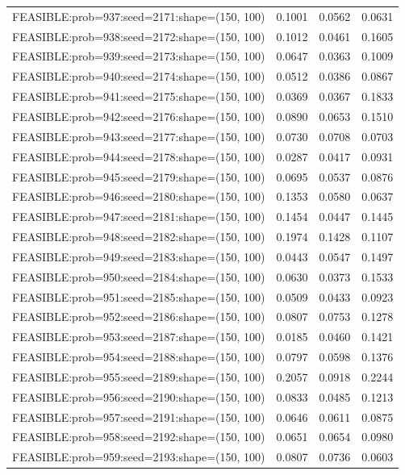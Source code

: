 \begin{longtable}{lccc}
FEASIBLE:prob=937:seed=2171:shape=(150, 100) & 0.1001 & 0.0562 & 0.0631 \\
FEASIBLE:prob=938:seed=2172:shape=(150, 100) & 0.1012 & 0.0461 & 0.1605 \\
FEASIBLE:prob=939:seed=2173:shape=(150, 100) & 0.0647 & 0.0363 & 0.1009 \\
FEASIBLE:prob=940:seed=2174:shape=(150, 100) & 0.0512 & 0.0386 & 0.0867 \\
FEASIBLE:prob=941:seed=2175:shape=(150, 100) & 0.0369 & 0.0367 & 0.1833 \\
FEASIBLE:prob=942:seed=2176:shape=(150, 100) & 0.0890 & 0.0653 & 0.1510 \\
FEASIBLE:prob=943:seed=2177:shape=(150, 100) & 0.0730 & 0.0708 & 0.0703 \\
FEASIBLE:prob=944:seed=2178:shape=(150, 100) & 0.0287 & 0.0417 & 0.0931 \\
FEASIBLE:prob=945:seed=2179:shape=(150, 100) & 0.0695 & 0.0537 & 0.0876 \\
FEASIBLE:prob=946:seed=2180:shape=(150, 100) & 0.1353 & 0.0580 & 0.0637 \\
FEASIBLE:prob=947:seed=2181:shape=(150, 100) & 0.1454 & 0.0447 & 0.1445 \\
FEASIBLE:prob=948:seed=2182:shape=(150, 100) & 0.1974 & 0.1428 & 0.1107 \\
FEASIBLE:prob=949:seed=2183:shape=(150, 100) & 0.0443 & 0.0547 & 0.1497 \\
FEASIBLE:prob=950:seed=2184:shape=(150, 100) & 0.0630 & 0.0373 & 0.1533 \\
FEASIBLE:prob=951:seed=2185:shape=(150, 100) & 0.0509 & 0.0433 & 0.0923 \\
FEASIBLE:prob=952:seed=2186:shape=(150, 100) & 0.0807 & 0.0753 & 0.1278 \\
FEASIBLE:prob=953:seed=2187:shape=(150, 100) & 0.0185 & 0.0460 & 0.1421 \\
FEASIBLE:prob=954:seed=2188:shape=(150, 100) & 0.0797 & 0.0598 & 0.1376 \\
FEASIBLE:prob=955:seed=2189:shape=(150, 100) & 0.2057 & 0.0918 & 0.2244 \\
FEASIBLE:prob=956:seed=2190:shape=(150, 100) & 0.0833 & 0.0485 & 0.1213 \\
FEASIBLE:prob=957:seed=2191:shape=(150, 100) & 0.0646 & 0.0611 & 0.0875 \\
FEASIBLE:prob=958:seed=2192:shape=(150, 100) & 0.0651 & 0.0654 & 0.0980 \\
FEASIBLE:prob=959:seed=2193:shape=(150, 100) & 0.0807 & 0.0736 & 0.0603 \\

\end{longtable}
